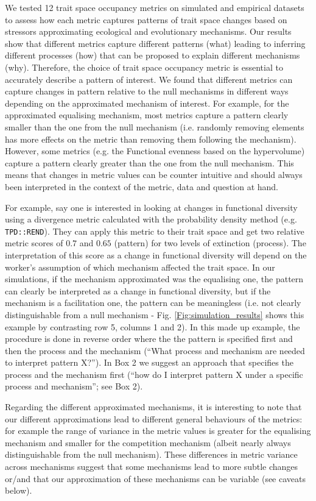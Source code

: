 \documentclass[12pt,letterpaper]{article}
\begin{document}
We tested 12 trait space occupancy metrics on simulated and empirical datasets to assess how each metric captures patterns of trait space changes based on stressors approximating ecological and evolutionary mechanisms.
Our results show that different metrics capture different patterns (what) leading to inferring different processes (how) that can be proposed to explain different mechanisms (why).
Therefore, the choice of trait space occupancy metric is essential to accurately describe a pattern of interest.
We found that different metrics can capture changes in pattern relative to the null mechanisms in different ways depending on the approximated mechanism of interest.
For example, for the approximated equalising mechanism, most metrics capture a pattern clearly smaller than the one from the null mechanism (i.e. randomly removing elements has more effects on the metric than removing them following the mechanism).
However, some metrics (e.g. the Functional evenness based on the hypervolume) capture a pattern clearly greater than the one from the null mechanism.
This means that changes in metric values can be counter intuitive and should always been interpreted in the context of the metric, data and question at hand.

For example, say one is interested in looking at changes in functional diversity using a divergence metric calculated with the probability density method (e.g. \texttt{TPD::REND}).
They can apply this metric to their trait space and get two relative metric scores of $0.7$ and $0.65$ (pattern) for two levels of extinction (process).
The interpretation of this score as a change in functional diversity will depend on the worker's assumption of which mechanism affected the trait space.
In our simulations, if the mechanism approximated was the equalising one, the pattern can clearly be interpreted as a change in functional diversity, but if the mechanism is a facilitation one, the pattern can be meaningless (i.e. not clearly distinguishable from a null mechanism - Fig. \ref{Fig:simulation_results} shows this example by contrasting row 5, columns 1 and 2).
In this made up example, the procedure is done in reverse order where the the pattern is specified first and then the process and the mechanism (``What process and mechanism are needed to interpret pattern X?'').
In Box 2 we suggest an approach that specifies the process and the mechanism first (``how do I interpret pattern X under a specific process and mechanism''; see Box 2).

Regarding the different approximated mechanisms, it is interesting to note that our different approximations lead to different general behaviours of the metrics: for example the range of variance in the metric values is greater for the equalising mechanism and smaller for the competition mechanism (albeit nearly always distinguishable from the null mechanism).
These differences in metric variance across mechanisms suggest that some mechanisms lead to more subtle changes or/and that our approximation of these mechanisms can be variable (see caveats below).
\end{document}
